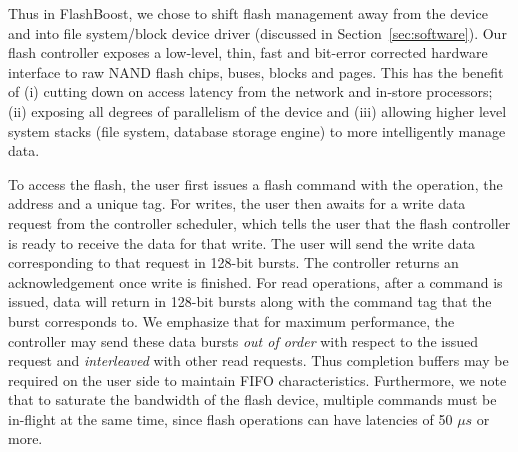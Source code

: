 Thus in FlashBoost, we chose to shift flash management
away from the device and into file system/block device driver (discussed in
Section~\ref{sec:software}). Our flash controller exposes a low-level, thin,
fast and bit-error corrected hardware interface to raw NAND flash chips, buses,
blocks and pages. This has the benefit of (i) cutting down on access latency
from the network and in-store processors; (ii) exposing all degrees of
parallelism of the device and (iii) allowing higher level system stacks (file
system, database storage engine) to more intelligently manage data. 

To access the flash, the user first issues a flash command
with the operation, the address and a unique tag.
For writes, the user then awaits for a write data request from
the controller scheduler, which tells the user that the flash controller is
ready to receive the data for that write. The user will send the write data
corresponding to that request in 128-bit bursts. The controller returns an
acknowledgement once write is finished. 
For read operations, after a command is issued,
data will return in 128-bit bursts along with the command tag that the
burst corresponds to. We emphasize that for maximum performance, the
controller may send these data bursts \emph{out of order} with respect to
the issued request and \emph{interleaved} with other read requests.
Thus completion buffers may be required on the user side to maintain FIFO
characteristics. Furthermore,
we note that to saturate the bandwidth of the flash device, multiple
commands must be in-flight at the same time, since flash operations
can have latencies of 50 $\mu s$ or more. 


